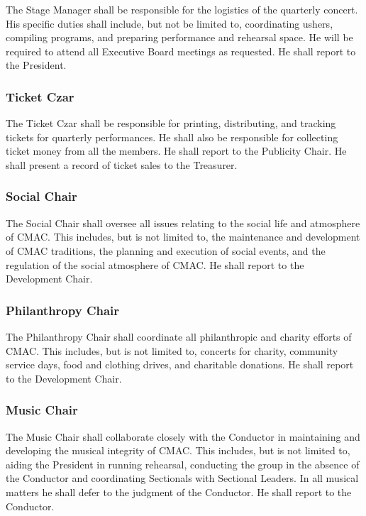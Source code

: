 \documentclass{article}
\begin{document}
The Stage Manager shall be responsible for the logistics of the quarterly
concert. His specific duties shall include, but not be limited to,
coordinating ushers, compiling programs, and preparing performance
and rehearsal space. He will be required to attend all Executive Board
meetings as requested. He shall report to the President.


\subsubsection{Ticket Czar}

The Ticket Czar shall be responsible for printing, distributing, and
tracking tickets for quarterly performances. He shall also be responsible
for collecting ticket money from all the members. He shall report
to the Publicity Chair. He shall present a record of ticket sales
to the Treasurer.


\subsubsection{Social Chair}

The Social Chair shall oversee all issues relating to the social life
and atmosphere of CMAC. This includes, but is not limited to, the
maintenance and development of CMAC traditions, the planning and execution
of social events, and the regulation of the social atmosphere of CMAC.
He shall report to the Development Chair.


\subsubsection{Philanthropy Chair}

The Philanthropy Chair shall coordinate all philanthropic and charity
efforts of CMAC. This includes, but is not limited to, concerts for
charity, community service days, food and clothing drives, and charitable
donations. He shall report to the Development Chair.


\subsubsection{Music Chair}

The Music Chair shall collaborate closely with the Conductor in maintaining
and developing the musical integrity of CMAC. This includes, but is
not limited to, aiding the President in running rehearsal, conducting
the group in the absence of the Conductor and coordinating Sectionals
with Sectional Leaders. In all musical matters he shall defer to the
judgment of the Conductor. He shall report to the Conductor.
\end{document}

